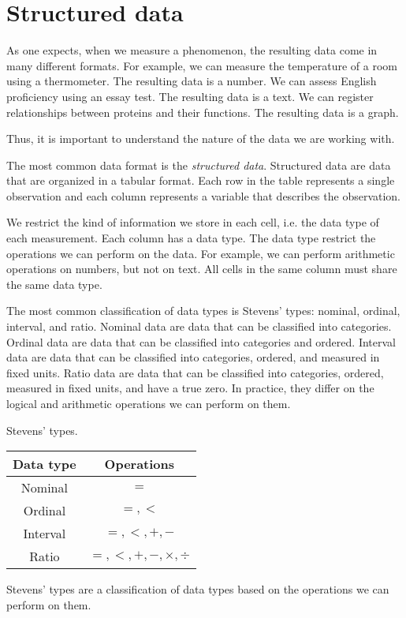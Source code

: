 \section{Structured data}

As one expects, when we measure a phenomenon, the resulting data come in many different
formats.  For example, we can measure the temperature of a room using a thermometer.  The
resulting data is a number.  We can assess English proficiency using an essay test.  The
resulting data is a text.  We can register relationships between proteins and
their functions.  The resulting data is a graph.

Thus, it is important to understand the nature of the data we are working with.

The most common data format is the \emph{structured data}.  Structured data are data that
are organized in a tabular format.  Each row in the table represents a single observation
and each column represents a variable that describes the observation.

We restrict the kind of information we store in each cell, i.e. the data type of each
measurement.  Each column has a data type.  The data type restrict the operations we can
perform on the data.  For example, we can perform arithmetic operations on numbers, but
not on text.  All cells in the same column must share the same data type.

The most common classification of data types is Stevens' types: nominal, ordinal,
interval, and ratio.  Nominal data are data that can be classified into categories.
Ordinal data are data that can be classified into categories and ordered.  Interval data
are data that can be classified into categories, ordered, and measured in fixed units.
Ratio data are data that can be classified into categories, ordered, measured in fixed
units, and have a true zero.  In practice, they differ on the logical and arithmetic operations
we can perform on them.

\begin{tablebox}[label=tab:stevens]{Stevens' types.}
  \centering
  \begin{tabular}{cc}
    \toprule
    \textbf{Data type} & \textbf{Operations} \\
    \midrule
    Nominal & $=$ \\
    Ordinal & $=, <$ \\
    Interval & $=, <, +, - $ \\
    Ratio & $=, <, +, -, \times, \div$ \\
    \bottomrule
  \end{tabular}
  \tcblower
  Stevens' types are a classification of data types based on the operations we can perform
  on them.
\end{tablebox}

